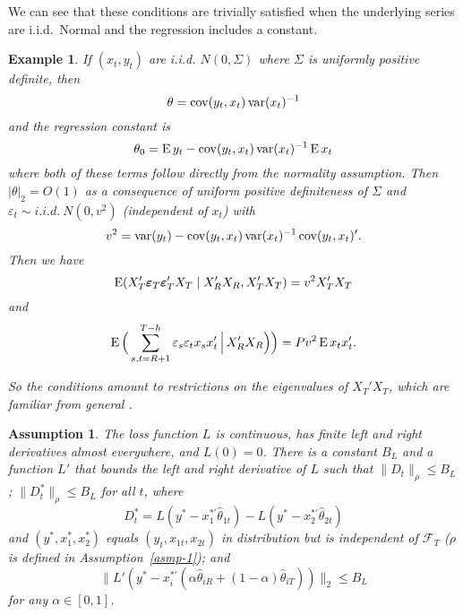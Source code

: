 \documentclass[11pt]{article}
\newcommand{\e}{\varepsilon}
\newtheorem{asmp}{Assumption}
\newtheorem{example}{Example}
\begin{document}
We can see that these conditions are trivially satisfied when the
underlying series are i.i.d.\ Normal and the regression includes a
constant.
\begin{example}
  If $(x_{t}, y_t)$ are i.i.d. $N(0, \Sigma)$ where $\Sigma$ is
  uniformly positive definite, then
  \begin{equation*}
    \theta = \operatorname{cov}(y_t, x_t) \operatorname{var}(x_t)^{-1}
  \end{equation*}
  and the regression constant is
  \begin{equation*}
    \theta_0 = \operatorname{E} y_t - \operatorname{cov}(y_t, x_t) \operatorname{var}(x_t)^{-1} \operatorname{E} x_t
  \end{equation*}
  where both of these terms follow directly from the normality
  assumption.  Then $|\theta|_2 = O(1)$ as a consequence of uniform
  positive definiteness of $\Sigma$ and $\varepsilon_t \sim i.i.d.\
  N(0, v^2)$ (independent of $x_t$) with
  \begin{equation*}
    v^2 = \operatorname{var}(y_t) - \operatorname{cov}(y_t, x_t) \operatorname{var}(x_t)^{-1} \operatorname{cov}(y_t, x_t)'.
  \end{equation*}
  Then we have
  \begin{equation*}
    \operatorname{E}(X_{T}'\boldsymbol{\varepsilon}_{T}\boldsymbol{\varepsilon}_{T}'X_T \mid X_{R}'X_{R}, X_{T}'X_{T})
    = v^2 X_{T}'X_{T}
  \end{equation*}
  and
  \begin{equation*}
    \E\Big( \sum_{s,t=R+1}^{T-h} \e_s \e_t x_s x_t'
    \,\Big|\, X_{R}'X_{R} \Big)\Big) = P v^2 \E x_t x_t'.
  \end{equation*}

  So the conditions amount to restrictions on the eigenvalues of
  $X_T'X_T$, which are familiar from general \ols.
\end{example}

\begin{asmp}\label{asmp-3}
  The loss function $L$ is continuous, has finite left and right
  derivatives almost everywhere, and $L(0) = 0$.  There is a constant
  $B_L$ and a function $L'$ that bounds the left and right derivative
  of $L$ such that $\|D_t\|_\rho \leq B_L$; $\|D_t^*\|_\rho \leq B_L$
  for all $t$, where
  \begin{equation*}
    D_t^* = L(y^* - x_1^{*\prime}\hat\theta_{1t})
    - L(y^* - x_2^{*\prime}\hat\theta_{2t})
  \end{equation*}
  and $(y^*, x_1^*, x_2^*)$ equals $(y_t, x_{1t}, x_{2t})$ in
  distribution but is independent of $\mathcal{F}_T$ ($\rho$ is defined
  in Assumption~\ref{asmp-1}); and
  \begin{equation*}
    \| L'(y^* - x_{i}^{*\prime}
    (\alpha \hat{\theta}_{iR} + (1-\alpha) \hat{\theta}_{iT})) \|_2
    \leq B_L
  \end{equation*}
  for any $\alpha \in [0,1]$.
\end{asmp}
\end{document}
